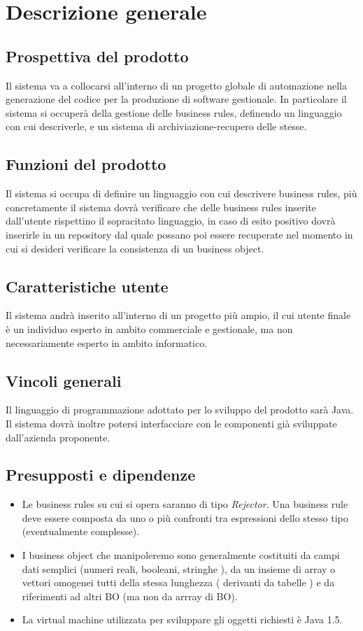 \documentclass[11pt,titlepage,a4paper]{report}
\begin{document}
\chapter{Descrizione generale}
\section{Prospettiva del prodotto}
Il sistema va a collocarsi all'interno di un progetto globale di automazione nella generazione del codice per la produzione di software gestionale. In particolare il sistema si occuper\`a della gestione delle business rules, definendo un linguaggio con cui descriverle, e un sistema di archiviazione-recupero delle stesse.
\section{Funzioni del prodotto}
Il sistema si occupa di definire un linguaggio con cui descrivere business rules, pi\`u concretamente il sistema dovr\`a verificare che delle business rules inserite dall'utente rispettino il sopracitato linguaggio, in caso di esito positivo dovr\`a inserirle in un repository dal quale possano poi essere recuperate nel momento in cui si desideri verificare la consistenza di un business object.
\section{Caratteristiche utente}
Il sistema andr\`a inserito all'interno di un progetto pi\`u ampio, il cui utente finale \`e un individuo esperto in ambito commerciale e gestionale, ma non necessariamente esperto in ambito informatico.
\section{Vincoli generali}
Il linguaggio di programmazione adottato per lo sviluppo del prodotto sar\`a Java. Il sistema dovr\`a inoltre potersi interfacciare con le componenti gi\`a sviluppate dall'azienda proponente. 
\section{Presupposti e dipendenze}
\begin{itemize}
\item{Le business rules su cui si opera saranno di tipo \textit{Rejector}. Una business rule deve essere composta da uno o pi\`u confronti tra espressioni dello stesso tipo (eventualmente complesse).}
\item{I business object che manipoleremo sono generalmente costituiti da campi dati semplici (numeri reali, booleani, stringhe ), da un insieme di array o vettori omogenei tutti della stessa lunghezza ( derivanti da tabelle ) e da riferimenti ad altri BO (ma non da arrray di BO). }
\item{La virtual machine utilizzata  per sviluppare gli oggetti richiesti \`e Java 1.5.}
\end{itemize}
\end{document}
